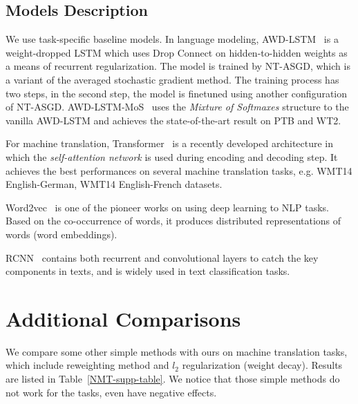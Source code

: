 \documentclass{article}
\begin{document}
\subsection{Models Description}

We use task-specific baseline models. In language modeling, AWD-LSTM~\cite{DBLP:journals/corr/abs-1708-02182} is a weight-dropped LSTM which uses Drop Connect on hidden-to-hidden weights as a means of recurrent regularization. The model is trained by NT-ASGD, which is a variant of the averaged stochastic gradient method. The training process has two steps, in the second step, the model is finetuned using another configuration of NT-ASGD.
AWD-LSTM-MoS~\cite{DBLP:journals/corr/abs-1711-03953} uses the \emph{Mixture of Softmaxes} structure to the vanilla AWD-LSTM and achieves the state-of-the-art result on PTB and WT2.

For machine translation,  Transformer~\cite{vaswani2017attention}  is a recently developed architecture in which the \emph{self-attention network} is used during encoding and decoding step. It achieves the best performances on several machine translation tasks, e.g. WMT14 English-German, WMT14 English-French datasets.

Word2vec~\cite{mikolov2013distributed} is one of the pioneer works on using deep learning to NLP tasks. Based on the co-occurrence of words, it produces distributed representations of words (word embeddings).

RCNN~\cite{lai2015recurrent} contains both recurrent and convolutional layers to catch the key components in texts, and is widely used in text classification tasks.

\section{Additional Comparisons}
We compare some other simple methods with ours on machine translation tasks, which include reweighting method and $l_2$ regularization (weight decay). Results are listed in Table~\ref{NMT-supp-table}. We notice that those simple methods do not work for the tasks, even have negative effects.
\end{document}
